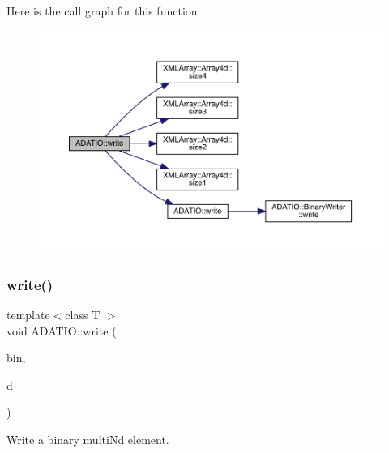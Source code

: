 Here is the call graph for this function\+:\nopagebreak
\begin{figure}[H]
\begin{center}
\leavevmode
\includegraphics[width=350pt]{d0/dba/namespaceADATIO_ad3c579901108d678f21ec1a97d0ab197_cgraph}
\end{center}
\end{figure}
\mbox{\label{namespaceADATIO_a0f804d3b56353fad83984a5668212660}} 
\subsubsection{\texorpdfstring{write()}{write()}\hspace{0.1cm}{\footnotesize\ttfamily [20/25]}}
{\footnotesize\ttfamily template$<$class T $>$ \\
void A\+D\+A\+T\+I\+O\+::write (\begin{DoxyParamCaption}\item[{\mbox{\hyperlink{classADATIO_1_1BinaryWriter}{Binary\+Writer}} \&}]{bin,  }\item[{const \mbox{\hyperlink{classADAT_1_1ArrayNd}{A\+D\+A\+T\+::\+Array\+Nd}}$<$ T $>$ \&}]{d }\end{DoxyParamCaption})\hspace{0.3cm}{\ttfamily [inline]}}



Write a binary multi\+Nd element. 

